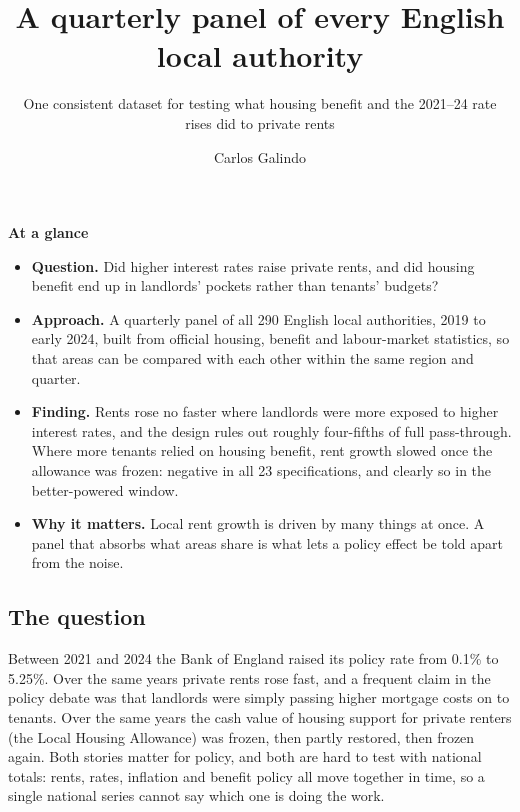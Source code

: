 \documentclass[
  british,
  a4paper,
]{article}
\title{A quarterly panel of every English local authority}
\subtitle{One consistent dataset for testing what housing benefit and
the 2021--24 rate rises did to private rents}
\author{Carlos Galindo}
\date{}
\providecommand{\tightlist}{%
  \setlength{\itemsep}{0pt}\setlength{\parskip}{0pt}}
\begin{document}
\maketitle


\begin{tcolorbox}[enhanced jigsaw, arc=.35mm, bottomrule=.15mm, breakable, colback=white, colframe=quarto-callout-note-color-frame, left=2mm, leftrule=.75mm, opacityback=0, rightrule=.15mm, toprule=.15mm]

\vspace{-3mm}\textbf{At a glance}\vspace{3mm}

\begin{itemize}
\tightlist
\item
  \textbf{Question.} Did higher interest rates raise private rents, and
  did housing benefit end up in landlords' pockets rather than tenants'
  budgets?
\item
  \textbf{Approach.} A quarterly panel of all 290 English local
  authorities, 2019 to early 2024, built from official housing, benefit
  and labour-market statistics, so that areas can be compared with each
  other within the same region and quarter.
\item
  \textbf{Finding.} Rents rose no faster where landlords were more
  exposed to higher interest rates, and the design rules out roughly
  four-fifths of full pass-through. Where more tenants relied on housing
  benefit, rent growth slowed once the allowance was frozen: negative in
  all 23 specifications, and clearly so in the better-powered window.
\item
  \textbf{Why it matters.} Local rent growth is driven by many things at
  once. A panel that absorbs what areas share is what lets a policy
  effect be told apart from the noise.
\end{itemize}

\end{tcolorbox}

\subsection{The question}\label{the-question}

Between 2021 and 2024 the Bank of England raised its policy rate from
0.1\% to 5.25\%. Over the same years private rents rose fast, and a
frequent claim in the policy debate was that landlords were simply
passing higher mortgage costs on to tenants. Over the same years the
cash value of housing support for private renters (the Local Housing
Allowance) was frozen, then partly restored, then frozen again. Both
stories matter for policy, and both are hard to test with national
totals: rents, rates, inflation and benefit policy all move together in
time, so a single national series cannot say which one is doing the
work.
\end{document}
